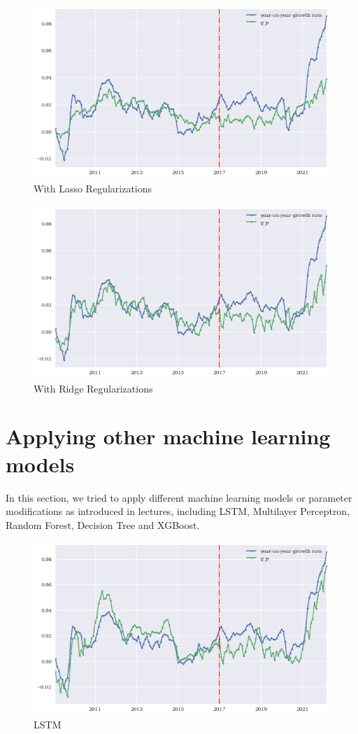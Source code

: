 \documentclass[reqno]{amsart}
\theoremstyle{definition}
\begin{document}
\begin{figure}[h]
\centering
\caption{With Lasso Regularizations}
\includegraphics[scale=0.8]{LASSO.png}
\end{figure}

\begin{figure}[h]
\centering
\caption{With Ridge Regularizations}
\includegraphics[scale=0.8]{Ridge.png}
\end{figure}
\newpage

\newpage
\section{Applying other machine learning models}
In this section, we tried to apply different machine learning models or parameter modifications as introduced in lectures, including LSTM, Multilayer Perceptron, Random Forest, Decision Tree and XGBoost.

\begin{figure}[h]
\centering
\caption{LSTM}
\includegraphics[scale=0.8]{LSTM.png}
\end{figure}
\end{document}
